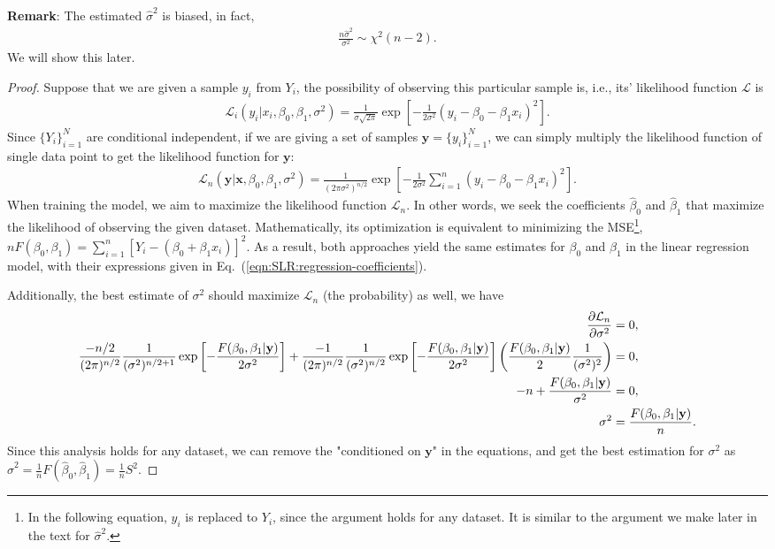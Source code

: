 \documentclass{book}
\begin{document}
\noindent \textbf{Remark}: The estimated $\hat{\sigma}^2$ is biased, in fact,
\begin{align*}
    \frac{n\hat{\sigma}^2}{\sigma^2} \sim \chi^2(n-2).
\end{align*}
We will show this later.
\begin{proof}
Suppose that we are given a sample $y_i$ from $Y_i$, the possibility of observing this particular sample is, i.e., its' likelihood function $\mathcal{L}$ is 
\begin{align}
    \mathcal{L}_i(y_i|x_i,\beta_0,\beta_1,\sigma^2) = 
\frac{1}{\sigma\sqrt{2\pi}}
\exp\left[
-\frac{1}{2\sigma^2}(y_i - \beta_0 -\beta_1 x_i)^2
\right].
\end{align}
Since $\{Y_i\}_{i=1}^{N}$ are conditional independent, if we are giving a set of samples $\mathbf{y}=\{y_i\}_{i=1}^N$, we can simply multiply the likelihood function of single data point to get the likelihood function for $\mathbf{y}$: 
\begin{align*}
    \mathcal{L}_n(\mathbf{y}|\mathbf{x},\beta_0,\beta_1,\sigma^2) = 
    \frac{1}{(2\pi\sigma^2)^{n/2}}
    \exp\left[
    -\frac{1}{2\sigma^2} \sum_{i=1}^n (y_i - \beta_0 -\beta_1 x_i)^2
    \right].
\end{align*}
When training the model, we aim to maximize the likelihood function $\mathcal{L}_n$. In other words, we seek the coefficients $\hat\beta_0$ and $\hat\beta_1$ that maximize the likelihood of observing the given dataset. Mathematically, its optimization is equivalent to minimizing the MSE\footnote{In the following equation, $y_i$ is replaced to $Y_i$, since the argument holds for any dataset. It is similar to the argument we make later in the text for $\hat\sigma^2$.}, $nF(\beta_0,\beta_1) = \sum_{i=1}^n\left[Y_i - (\beta_0 + \beta_1 x_i)\right]^2$. As a result, both approaches yield the same estimates for $\beta_0$ and $\beta_1$ in the linear regression model, with their expressions given in Eq.~(\ref{eqn:SLR:regression-coefficients}).

Additionally, the best estimate of $\sigma^2$ should maximize $\mathcal{L}_n$ (the probability) as well, we have
\begin{align*}
    \pdv{\mathcal{L}_n}{\sigma^2} &= 0,\\
    \frac{-n/2}{(2\pi)^{n/2}} \frac{1}{(\sigma^2)^{n/2+1}}\exp\left[-\frac{F(\beta_0,\beta_1|\mathbf{y})}{2\sigma^2}\right] + \frac{-1}{(2\pi)^{n/2}} \frac{1}{(\sigma^2)^{n/2}}\exp\left[-\frac{F(\beta_0,\beta_1|\mathbf{y})}{2\sigma^2}\right] \left(\frac{F(\beta_0,\beta_1|\mathbf{y})}{2}\frac{1}{(\sigma^2)^2}\right) &= 0,\\
    -n + \frac{F(\beta_0,\beta_1|\mathbf{y})}{\sigma^2} &= 0,\\
    \sigma^2 &= \frac{F(\beta_0,\beta_1|\mathbf{y})}{n}.
\end{align*}
Since this analysis holds for any dataset, we can remove the "conditioned on $\mathbf{y}$" in the equations, and get the best estimation for $\sigma^2$ as $\hat\sigma^2 = \frac{1}{n}F(\hat\beta_0,\hat\beta_1) = \frac{1}{n}S^2$.
\end{proof}
\end{document}
